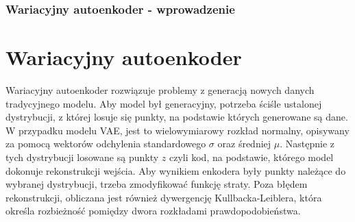 \documentclass{beamer}
\begin{document}
	\begin{frame}
		\frametitle{Wariacyjny autoenkoder - wprowadzenie}
		\section{Wariacyjny autoenkoder}
		Wariacyjny autoenkoder rozwiązuje problemy z generacją nowych danych tradycyjnego modelu. Aby model był generacyjny, potrzeba ściśle ustalonej dystrybucji, z której losuje się punkty, na podstawie których generowane są dane. W przypadku modelu VAE, jest to wielowymiarowy rozkład normalny, opisywany za pomocą wektorów odchylenia standardowego $\sigma$ oraz średniej $\mu$. Następnie z tych dystrybucji losowane są punkty $z$ czyli kod, na podstawie, którego model dokonuje rekonstrukcji wejścia. Aby wynikiem enkodera były punkty należące do wybranej dystrybucji, trzeba zmodyfikować funkcję straty. Poza błędem rekonstrukcji, obliczana jest również dywergencję Kullbacka-Leiblera, która określa rozbieżność pomiędzy dwora rozkładami prawdopodobieństwa. 
	\end{frame}

\end{document}
